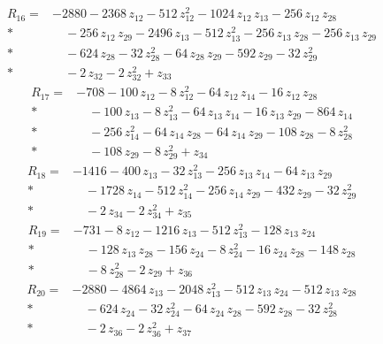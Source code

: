 \documentclass[10pt]{article}
\begin{document}
\begin{align*}
R_{16}={}& - 2880 - 2368\,z_{12} - 512\,z_{12}^{2} - 1024\,z_{12}\,z_{13} - 256\,z_{12}\,z_{28} \\*
&\quad - 256\,z_{12}\,z_{29} - 2496\,z_{13} - 512\,z_{13}^{2} - 256\,z_{13}\,z_{28} - 256\,z_{13}\,z_{29} \\*
&\quad - 624\,z_{28} - 32\,z_{28}^{2} - 64\,z_{28}\,z_{29} - 592\,z_{29} - 32\,z_{29}^{2} \\*
&\quad - 2\,z_{32} - 2\,z_{32}^{2} + z_{33}
\end{align*}
\begin{align*}
R_{17}={}& - 708 - 100\,z_{12} - 8\,z_{12}^{2} - 64\,z_{12}\,z_{14} - 16\,z_{12}\,z_{28} \\*
&\quad - 100\,z_{13} - 8\,z_{13}^{2} - 64\,z_{13}\,z_{14} - 16\,z_{13}\,z_{29} - 864\,z_{14} \\*
&\quad - 256\,z_{14}^{2} - 64\,z_{14}\,z_{28} - 64\,z_{14}\,z_{29} - 108\,z_{28} - 8\,z_{28}^{2} \\*
&\quad - 108\,z_{29} - 8\,z_{29}^{2} + z_{34}
\end{align*}
\begin{align*}
R_{18}={}& - 1416 - 400\,z_{13} - 32\,z_{13}^{2} - 256\,z_{13}\,z_{14} - 64\,z_{13}\,z_{29} \\*
&\quad - 1728\,z_{14} - 512\,z_{14}^{2} - 256\,z_{14}\,z_{29} - 432\,z_{29} - 32\,z_{29}^{2} \\*
&\quad - 2\,z_{34} - 2\,z_{34}^{2} + z_{35}
\end{align*}
\begin{align*}
R_{19}={}& - 731 - 8\,z_{12} - 1216\,z_{13} - 512\,z_{13}^{2} - 128\,z_{13}\,z_{24} \\*
&\quad - 128\,z_{13}\,z_{28} - 156\,z_{24} - 8\,z_{24}^{2} - 16\,z_{24}\,z_{28} - 148\,z_{28} \\*
&\quad - 8\,z_{28}^{2} - 2\,z_{29} + z_{36}
\end{align*}
\begin{align*}
R_{20}={}& - 2880 - 4864\,z_{13} - 2048\,z_{13}^{2} - 512\,z_{13}\,z_{24} - 512\,z_{13}\,z_{28} \\*
&\quad - 624\,z_{24} - 32\,z_{24}^{2} - 64\,z_{24}\,z_{28} - 592\,z_{28} - 32\,z_{28}^{2} \\*
&\quad - 2\,z_{36} - 2\,z_{36}^{2} + z_{37}
\end{align*}
\end{document}
